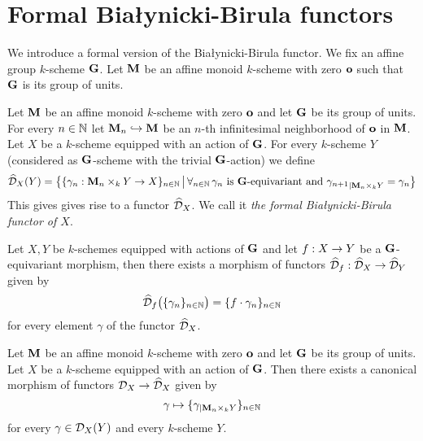 \section{Formal Bia{\l}ynicki-Birula functors}
\noindent
We introduce a formal version of the Bia{\l}ynicki-Birula functor. We fix an affine group $k$-scheme $\mathbf{G}$. Let $\mathbf{M}$ be an affine monoid $k$-scheme with zero $\mathbf{o}$ such that $\mathbf{G}$ is its group of units.

\begin{definition}
Let $\mathbf{M}$ be an affine monoid $k$-scheme with zero $\mathbf{o}$ and let $\mathbf{G}$ be its group of units. For every $n\in {\mathbb N}$ let $\mathbf{M}_n\hookrightarrow \mathbf{M}$ be an $n$-th infinitesimal neighborhood of $\mathbf{o}$ in $\mathbf{M}$. Let $X$ be a $k$-scheme equipped with an action of $\mathbf{G}$. For every $k$-scheme $Y$ (considered as $\mathbf{G}$-scheme with the trivial $\mathbf{G}$-action) we define
$$\widehat{{\mathcal D}}_X(Y) = \big\{\{\gamma_n:\mathbf{M}_n\times_kY\rightarrow X\}_{n\in {\mathbb N}}\,\big|\,\forall_{n\in {\mathbb N}}\,\gamma_n\mbox{ is }\mathbf{G}\mbox{-equivariant and }{\gamma_{n+1}}_{\mid \mathbf{M}_n\times_kY} = \gamma_n\big\}$$
This gives gives rise to a functor $\widehat{{\mathcal D}}_X$. We call it \textit{the formal Bia{\l}ynicki-Birula functor of $X$}.
\end{definition}

\begin{remark}\label{remark:functoriality_of_formal_bb_functor}
Let $X,Y$ be $k$-schemes equipped with actions of $\mathbf{G}$ and let $f:X\rightarrow Y$ be a $\mathbf{G}$-equivariant morphism, then there exists a morphism of functors $\widehat{{\mathcal D}}_f:\widehat{{\mathcal D}}_X\rightarrow \widehat{{\mathcal D}}_Y$ given by
$$\widehat{{\mathcal D}}_f\big(\{\gamma_n\}_{n\in {\mathbb N}}\big) = \{f\cdot \gamma_n\}_{n\in {\mathbb N}}$$
for every element $\gamma$ of the functor $\widehat{{\mathcal D}}_X$. 
\end{remark}

\begin{remark}\label{remark:comparison_between_formal_and_algebraic_bb_functors}
Let $\mathbf{M}$ be an affine monoid $k$-scheme with zero $\mathbf{o}$ and let $\mathbf{G}$ be its group of units. Let $X$ be a $k$-scheme equipped with an action of $\mathbf{G}$. Then there exists a canonical morphism of functors ${\mathcal D}_X\rightarrow \widehat{{\mathcal D}}_X$ given by
$$\gamma \mapsto \{\gamma_{\mid \mathbf{M}_n\times_kY}\}_{n\in {\mathbb N}}$$
for every $\gamma \in {\mathcal D}_X(Y)$ and every $k$-scheme $Y$.
\end{remark}

